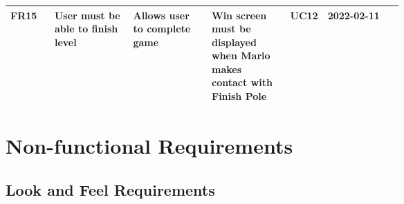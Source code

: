 \documentclass[12pt, titlepage]{article}
\begin{document}
\begin{longtable}{|l|p{0.2\linewidth}|p{0.2\linewidth}|p{0.2\linewidth}|p{0.06\linewidth}|l|}
FR15        & User must be able to finish level                                    & Allows user to complete game                                                         & Win screen must be displayed when Mario makes contact with Finish Pole                              & UC12              & 2022-02-11       \\ \hline
\end{longtable}

\section{Non-functional Requirements}

\subsection{Look and Feel Requirements}
\end{document}

